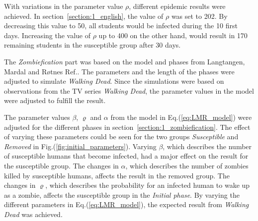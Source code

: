 \documentclass[%
twoside,                 %
final,                   %
chapterprefix=true,      %
open=right               %
10pt]{book}
\begin{document}
\vspace{3mm}




\vspace{3mm}


With variations in the parameter value $\rho$, different epidemic results were achieved. In section~\ref{section:1_english}, the value of $\rho$ was set to 202. By decreasing this value to 50, all students would be infected during the 10 first days. Increasing the value of $\rho$ up to 400 on the other hand, would result in 170 remaining students in the susceptible group after 30 days. 


\vspace{3mm}




\vspace{3mm}


The \emph{Zombiefication} part was based on the model and phases from Langtangen, Mardal and Røtnes Ref.\cite{zombie-math}. The parameters and the length of the phases were adjusted to simulate \emph{Walking Dead}. Since the simulations were based on observations from the TV series \emph{Walking Dead}, the parameter values in the model were adjusted to fulfill the result. 


\vspace{3mm}




\vspace{3mm}


The parameter values $\beta$, $\varrho$ and $\alpha$ from the model in Eq.(\ref{eq:LMR_model}) were adjusted for the different phases in section~\ref{section:1_zombiefication}. The effect of varying these parameters could be seen for the two groups \emph{Susceptible} and \emph{Removed} in Fig.(\ref{fig:initial_parameters}). Varying $\beta$, which describes the number of susceptible humans that become infected, had a major effect on the result for the susceptible group. The changes in $\alpha$, which describes the number of zombies killed by susceptible humans, affects the result in the removed group. The changes in $\varrho$, which describes the probability for an infected human to wake up as a zombie, affects the susceptible group in the \emph{Initial phase}. By varying the different parameters in Eq.(\ref{eq:LMR_model}), the expected result from \emph{Walking Dead} was achieved.


\vspace{3mm}
\end{document}
